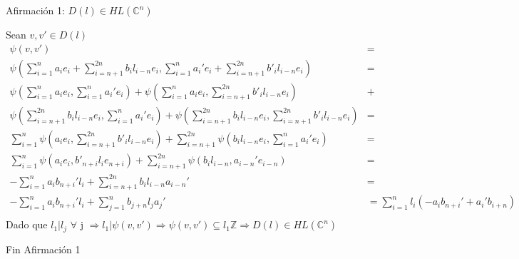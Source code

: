 \documentclass[12pt]{article}
\begin{document}
Afirmación 1: $D(l) \in HL(\mathbb{C}^n)$ 
 
 Sean $v,v' \in D(l)$
  $$\begin{aligned}
  \psi(v,v')&= \\
  \psi(\sum_{i=1}^n a_i e_i + \sum_{i=n+1}^{2n}b_i l_{i-n} e_i, \sum_{i=1}^n a_i' e_i + \sum_{i=n+1}^{2n}b'_i l_{i-n}e_i )&=\\
  \psi(\sum_{i=1}^n a_i e_i , \sum_{i=1}^n a_i' e_i ) + \psi(\sum_{i=1}^n a_i e_i , \sum_{i=n+1}^{2n}b'_i l_{i-n} e_i)  & + \\
  \psi( \sum_{i=n+1}^{2n}b_i l_{i-n}e_i, \sum_{i=1}^n a_i' e_i ) + \psi(\sum_{i=n+1}^{2n}b_i l_{i-n}e_i, \sum_{i=n+1}^{2n}b'_i l_{i-n}e_i)&=\\
   \sum_{i=1}^n \psi( a_i e_i , \sum_{i=n+1}^{2n}b'_i l_{i-n}e_i) + \sum_{i=n+1}^{2n}\psi( b_i l_{i-n}e_i, \sum_{i=1}^n a_i' e_i )&=\\
   \sum_{i=1}^n \psi( a_i e_i , b'_{n+i} l_{i} e_{n+i}) + \sum_{i=n+1}^{2n}\psi( b_i l_{i-n}, a_{i-n}' e_{i-n} )&=\\
   -\sum_{i=1}^n a_i b_{n+i}' l_i + \sum_{i=n+1}^{2n} b_i l_{i-n}a_{i-n}'&=\\
   -\sum_{i=1}^n a_i b_{n+i}' l_i + \sum_{j=1}^{n} b_{j+n} l_{j}a_{j}' &=\sum_{i=1}^{n} l_i(-a_i b_{n+i}' + a_i' b_{i+n})\\
  \end{aligned}$$ 
   Dado que $l_1|l_j$ $\forall$ j $\Rightarrow l_1| \psi(v,v') \Rightarrow \psi(v,v') \subseteq l_1 \mathbb{Z} \Rightarrow 
   D(l) \in HL(\mathbb{C}^n)$
   
 Fin Afirmación 1
\end{document}
